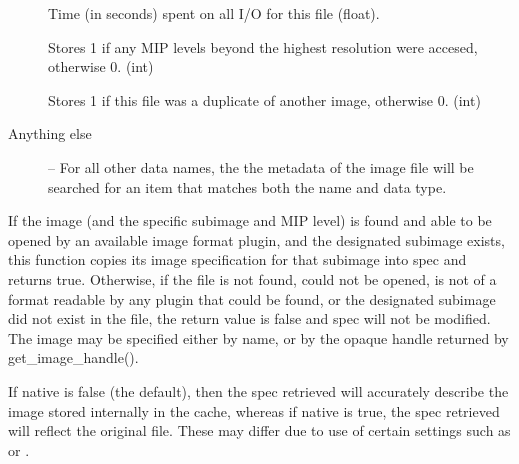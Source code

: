 \begin{description}
\item[\rm {}] Time (in seconds) spent on all I/O for this file ({\cf float}).

\item[\rm {}] Stores 1 if any MIP levels beyond the highest
resolution were accesed, otherwise 0. ({\cf int})

\item[\rm {}] Stores 1 if this file was a duplicate of
another image, otherwise 0. ({\cf int})

\item[Anything else] -- For all other data names, the
the metadata of the image file will be searched for an item that
matches both the name and data type.

\end{description}
\apiend


If the image (and the specific subimage and MIP level) is found and able to
be opened by an available
image format plugin, and the designated subimage exists, this function copies
its image specification for that subimage into {\cf spec} and returns
{\cf true}.  Otherwise, if the file is not found, could not be opened,
is not of a format readable by any plugin that could be found, or
the designated subimage did not exist in the file, the return value is
{\cf false} and {\cf spec} will not be modified.
The image may be specified either by name, or by the opaque handle returned
by {\cf get_image_handle()}.

If {\cf native} is {\cf false} (the default), then the spec retrieved
will accurately describe the image stored internally in the cache,
whereas if {\cf native} is {\cf true}, the spec retrieved will reflect
the original file.  These may differ due to use of certain \ImageCache
settings such as  or .

\apiend


